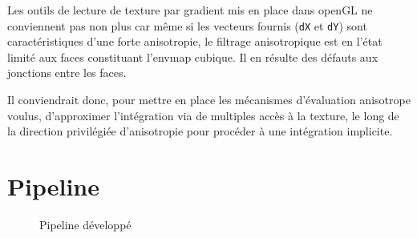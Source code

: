 \documentclass[10pt,a4paper,twoside, twocolumn]{report}
\newcommand*{\rootPath}{../}
\begin{document}
Les outils de lecture de texture par gradient mis en place dans openGL ne conviennent pas non plus car même si les vecteurs fournis (\texttt{dX} et \texttt{dY}) sont caractéristiques d’une forte anisotropie, le filtrage anisotropique est en l’état limité aux faces constituant l’envmap cubique. Il en résulte des défauts aux jonctions entre les faces.

Il conviendrait donc, pour mettre en place les mécanismes d’évaluation anisotrope voulus, d’approximer l’intégration via de multiples accès à la texture, le long de la direction privilégiée d’anisotropie pour procéder à une intégration implicite.


\section{Pipeline}

\begin{figure*}[ht!]
	\centering
	
	\caption{Pipeline développé}
	\label{fig:tikz:pipeline}
\end{figure*}
\end{document}
